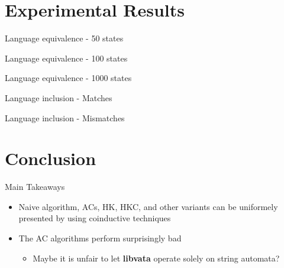 \documentclass[compress]{beamer}
\begin{document}
\section{Experimental Results}

\begin{frame}{Language equivalence - 50 states}
  \begin{figure}
    
  \end{figure}
\end{frame}

\begin{frame}{Language equivalence - 100 states}
  \begin{figure}
    
  \end{figure}
\end{frame}

\begin{frame}{Language equivalence - 1000 states}
  \begin{figure}
    
  \end{figure}
\end{frame}

\begin{frame}{Language inclusion - Matches}
  \begin{figure}
    
  \end{figure}
\end{frame}

\begin{frame}{Language inclusion - Mismatches}
  \begin{figure}
    
  \end{figure}
\end{frame}

\section{Conclusion}

\begin{frame}{Main Takeaways}
  \begin{itemize}
    \item<1-> Naive algorithm, ACs, HK, HKC, and other variants can be uniformely
      presented by using coinductive techniques
    \item<2-> The AC algorithms perform surprisingly bad
      \begin{itemize}
        \item Maybe it is unfair to let \textbf{libvata} operate solely on string automata?
      \end{itemize}
  \end{itemize}
\end{frame}
\end{document}
